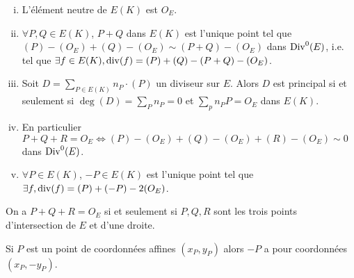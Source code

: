 	\begin{pop}
		\begin{enumerate}[(i)]
			\item L'élément neutre de $E(K)$ est $O_E$.
			\item $\forall P,Q \in E(K)$, $P + Q$ dans $E(K)$ est l'unique point tel que $(P) - (O_E) + (Q) - (O_E) \sim (P + Q) - (O_E)$ dans $\operatorname{Div}^0(E)$, i.e. tel que $\exists f \in E(K), \operatorname{div}(f) = (P) + (Q) - (P + Q) - (O_E)$.
			\item Soit $D = \sum_{P \in E(K)} n_P \cdot (P)$ un diviseur sur $E$.
				Alors $D$ est principal si et seulement si $\deg(D) = \sum_P n_P = 0$ et $\sum_p n_P P = O_E$ dans $E(K)$.
			\item En particulier $P + Q + R = O_E \iff (P) - (O_E) + (Q) - (O_E) + (R) - (O_E) \sim 0$ dans $\operatorname{Div}^0(E)$.
			\item $\forall P \in E(K)$, $-P \in E(K)$ est l'unique point tel que $\exists f, \operatorname{div}(f) = (P) + (-P) - 2 (O_E)$.
		\end{enumerate}
	\end{pop}
	
	\begin{rem}
		On a $P + Q + R = O_E$ si et seulement si $P,Q,R$ sont les trois points d'intersection de $E$ et d'une droite.
	\end{rem}
	
	\begin{rem}
		Si $P$ est un point de coordonnées affines $(x_P,y_P)$ alors $-P$ a pour coordonnées $(x_P,-y_P)$.
	\end{rem}